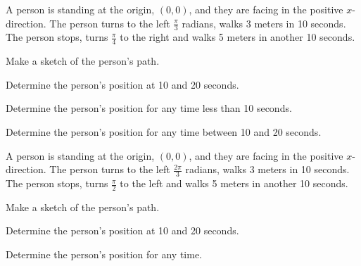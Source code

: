 \begin{problem}
\item A person is standing at the origin, $(0,0)$, and they are facing
  in the positive $x$-direction. The person turns to the left
  $\frac{\pi}{3}$ radians, walks 3 meters in 10 seconds. The person
  stops, turns $\frac{\pi}{4}$ to the right and walks 5 meters in
  another 10 seconds.
  \begin{subproblem}
    \item  Make a sketch of the person's path.
      \vfill
    \item Determine the person's position at 10 and 20 seconds.
      \vfill
    \item Determine the person's position for any time less than 10
      seconds.
      \vfill
    \item Determine the person's position for any time between 10 and
      20 seconds.
      \vfill
  \end{subproblem}
  \clearpage
\item A person is standing at the origin, $(0,0)$, and they are facing
  in the positive $x$-direction. The person turns to the left
  $\frac{2\pi}{3}$ radians, walks 3 meters in 10 seconds. The person
  stops, turns $\frac{\pi}{2}$ to the left and walks 5 meters in
  another 10 seconds.
  \begin{subproblem}
    \item  Make a sketch of the person's path.
      \vfill
    \item Determine the person's position at 10 and 20 seconds.
      \vfill
    \item Determine the person's position for any time.
      \vfill
  \end{subproblem}
\end{problem}

